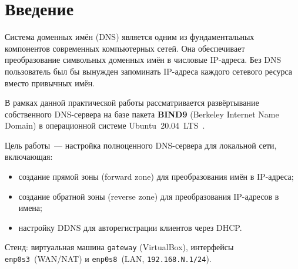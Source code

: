 \section*{Введение}

Система доменных имён (DNS) является одним из фундаментальных компонентов современных компьютерных сетей. Она обеспечивает преобразование символьных доменных имён в числовые IP-адреса. Без DNS пользователь был бы вынужден запоминать IP-адреса каждого сетевого ресурса вместо привычных имён.

В рамках данной практической работы рассматривается развёртывание собственного DNS-сервера на базе пакета \textbf{BIND9} (Berkeley Internet Name Domain) в операционной системе Ubuntu~20.04~LTS~\cite{bind9_admin}.

Цель работы~--- настройка полноценного DNS-сервера для локальной сети, включающая:
\begin{itemize}
  \item создание прямой зоны (forward zone) для преобразования имён в IP-адреса;
  \item создание обратной зоны (reverse zone) для преобразования IP-адресов в имена;
  \item настройку DDNS для авторегистрации клиентов через DHCP.
\end{itemize}

Стенд: виртуальная машина \texttt{gateway} (VirtualBox), интерфейсы \texttt{enp0s3}~(WAN/NAT) и \texttt{enp0s8}~(LAN, \texttt{192.168.N.1/24}).
